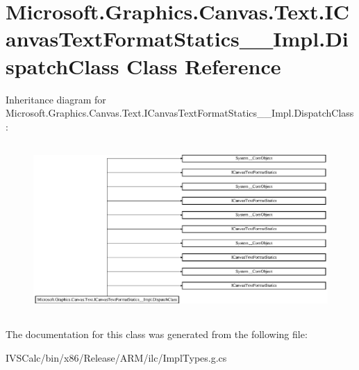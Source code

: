 \hypertarget{class_microsoft_1_1_graphics_1_1_canvas_1_1_text_1_1_i_canvas_text_format_statics_____impl_1_1_dispatch_class}{}\section{Microsoft.\+Graphics.\+Canvas.\+Text.\+I\+Canvas\+Text\+Format\+Statics\+\_\+\+\_\+\+Impl.\+Dispatch\+Class Class Reference}
\label{class_microsoft_1_1_graphics_1_1_canvas_1_1_text_1_1_i_canvas_text_format_statics_____impl_1_1_dispatch_class}
Inheritance diagram for Microsoft.\+Graphics.\+Canvas.\+Text.\+I\+Canvas\+Text\+Format\+Statics\+\_\+\+\_\+\+Impl.\+Dispatch\+Class\+:\begin{figure}[H]
\begin{center}
\leavevmode
\includegraphics[height=6.539279cm]{class_microsoft_1_1_graphics_1_1_canvas_1_1_text_1_1_i_canvas_text_format_statics_____impl_1_1_dispatch_class}
\end{center}
\end{figure}


The documentation for this class was generated from the following file\+:\begin{DoxyCompactItemize}
\item 
I\+V\+S\+Calc/bin/x86/\+Release/\+A\+R\+M/ilc/Impl\+Types.\+g.\+cs\end{DoxyCompactItemize}
